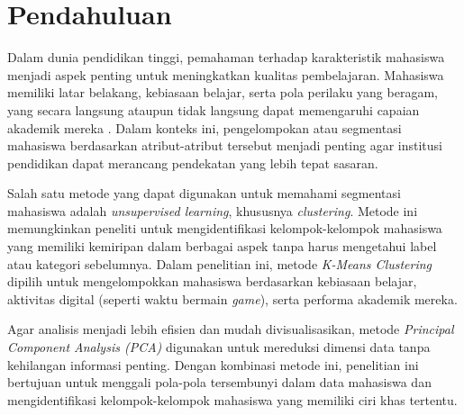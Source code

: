 \section{Pendahuluan}
Dalam dunia pendidikan tinggi, pemahaman terhadap karakteristik mahasiswa menjadi aspek penting untuk meningkatkan kualitas pembelajaran. Mahasiswa memiliki latar belakang, kebiasaan belajar, serta pola perilaku yang beragam, yang secara langsung ataupun tidak langsung dapat memengaruhi capaian akademik mereka \textcite{Aljaffer2024}. Dalam konteks ini, pengelompokan atau segmentasi mahasiswa berdasarkan atribut-atribut tersebut menjadi penting agar institusi pendidikan dapat merancang pendekatan yang lebih tepat sasaran.

Salah satu metode yang dapat digunakan untuk memahami segmentasi mahasiswa adalah \textit{unsupervised learning}, khususnya \textit{clustering}. Metode ini memungkinkan peneliti untuk mengidentifikasi kelompok-kelompok mahasiswa yang memiliki kemiripan dalam berbagai aspek tanpa harus mengetahui label atau kategori sebelumnya. Dalam penelitian ini, metode \textit{K-Means Clustering} dipilih untuk mengelompokkan mahasiswa berdasarkan kebiasaan belajar, aktivitas digital (seperti waktu bermain \textit{game}), serta performa akademik mereka.

Agar analisis menjadi lebih efisien dan mudah divisualisasikan, metode \textit{Principal Component Analysis (PCA)} digunakan untuk mereduksi dimensi data tanpa kehilangan informasi penting. Dengan kombinasi metode ini, penelitian ini bertujuan untuk menggali pola-pola tersembunyi dalam data mahasiswa dan mengidentifikasi kelompok-kelompok mahasiswa yang memiliki ciri khas tertentu.

